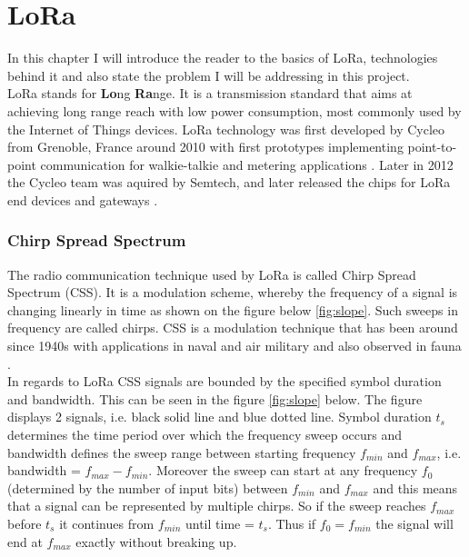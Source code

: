 \chapter{LoRa}

In this chapter I will introduce the reader to the 
basics of LoRa, technologies behind it and also state
the problem I will be addressing in this project.\\

LoRa stands for \textbf{Lo}ng \textbf{Ra}nge. It is a transmission standard that aims at achieving long range reach with low power consumption, most commonly used by the Internet of Things devices. LoRa technology was first developed by Cycleo from Grenoble, France around 2010 with first prototypes implementing point-to-point communication for walkie-talkie and metering applications \cite{trinity_panel}. Later in 2012 the Cycleo team was aquired by Semtech, and later released the chips for LoRa end devices and gateways \cite{origins}. 

\subsection{Chirp Spread Spectrum}

The radio communication technique used by LoRa is called Chirp Spread Spectrum (CSS). It is a modulation scheme, whereby the frequency of a signal is changing linearly in time \cite{ieee_2007} as shown on the figure below \ref{fig:slope}. Such sweeps in frequency are called chirps. CSS is a modulation technique that has been around since 1940s \cite{semtech_spec} with applications in naval and air military and also observed in fauna \cite{origins}.\\

In regards to LoRa CSS signals are bounded by the specified symbol duration and bandwidth. This can be seen in the figure \ref{fig:slope} below. The figure displays 2 signals, i.e. black solid line and blue dotted line. Symbol duration $t_s$ determines the time period over which the frequency sweep occurs and bandwidth defines the sweep range between starting frequency $f_{min}$ and $f_{max}$, i.e. bandwidth = $f_{max} - f_{min}$. Moreover the sweep can start at any frequency $f_0$ (determined by the number of input bits) between $f_{min}$ and $f_{max}$ and this means that a signal can be represented by multiple chirps. So if the sweep reaches $f_{max}$ before $t_s$ it 
continues from $f_{min}$ until time = $t_s$. Thus if $f_0 = f_{min}$
the signal will end at $f_{max}$ exactly without breaking up. 

